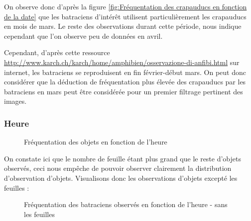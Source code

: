 \noindent On observe donc d'après la figure \ref{fig:Fréquentation des crapauducs en fonction de la date} que les batraciens d'intérêt utilisent particulièrement les crapauducs en mois de mars. Le reste des observations durant cette période, nous indique cependant que l'on observe peu de données en avril. \newline

Cependant, d'après cette ressource \url{http://www.karch.ch/karch/home/amphibien/osservazione-di-anfibi.html} sur internet, les batraciens se reproduisent en fin février-début mars. On peut donc considérer que la déduction de fréquentation plus élevée des crapauducs par les batraciens en mars peut être considérée pour un premier filtrage pertinent des images.

\subsubsection{Heure}

\begin{figure}[H]
    \centering
    \caption{Fréquentation des objets en fonction de l'heure}
    \label{fig:Fréquentation des objets en fonction de l'heure}
\end{figure}

On constate ici que le nombre de feuille étant plus grand que le reste d'objets observés, ceci nous empêche de pouvoir observer clairement la distribution d'observation d'objets. Visualisons donc les observations d'objets excepté les feuilles :

\begin{figure}[H]
    \centering
    \caption{Fréquentation des batraciens observés en fonction de l'heure - sans les feuilles}
    \label{fig:Fréquentation des crapauducs en fonction de l'heure - sans les feuilles}
\end{figure}

